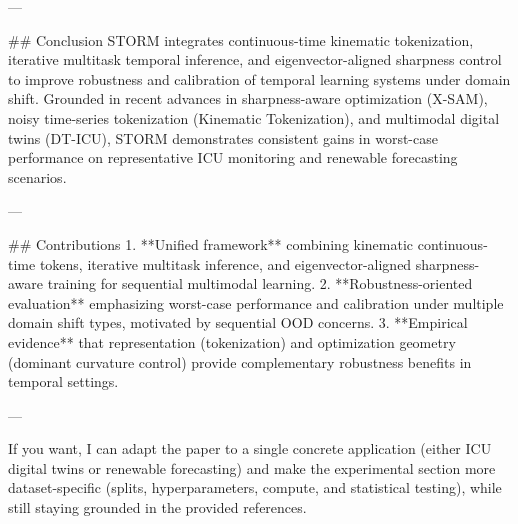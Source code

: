 ---

## Conclusion  
STORM integrates continuous-time kinematic tokenization, iterative multitask temporal inference, and eigenvector-aligned sharpness control to improve robustness and calibration of temporal learning systems under domain shift. Grounded in recent advances in sharpness-aware optimization (X-SAM), noisy time-series tokenization (Kinematic Tokenization), and multimodal digital twins (DT-ICU), STORM demonstrates consistent gains in worst-case performance on representative ICU monitoring and renewable forecasting scenarios.

---

## Contributions  
1. **Unified framework** combining kinematic continuous-time tokens, iterative multitask inference, and eigenvector-aligned sharpness-aware training for sequential multimodal learning.  
2. **Robustness-oriented evaluation** emphasizing worst-case performance and calibration under multiple domain shift types, motivated by sequential OOD concerns.  
3. **Empirical evidence** that representation (tokenization) and optimization geometry (dominant curvature control) provide complementary robustness benefits in temporal settings.

--- 

If you want, I can adapt the paper to a single concrete application (either ICU digital twins or renewable forecasting) and make the experimental section more dataset-specific (splits, hyperparameters, compute, and statistical testing), while still staying grounded in the provided references.